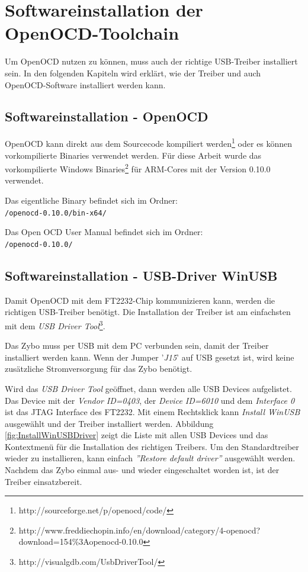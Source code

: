 \section{Softwareinstallation der OpenOCD-Toolchain}
\label{kapitel:SoftwareinstallationOpenOCDToolchain}
Um OpenOCD nutzen zu können, muss auch der richtige USB-Treiber installiert sein.
In den folgenden Kapiteln wird erklärt, wie der Treiber und auch OpenOCD-Software installiert werden kann.


\subsection{Softwareinstallation - OpenOCD}
OpenOCD kann direkt aus dem Sourcecode kompiliert werden\footnote{http://sourceforge.net/p/openocd/code/} oder es können vorkompilierte Binaries verwendet werden.
Für diese Arbeit wurde das vorkompilierte Windows Binaries\footnote{http://www.freddiechopin.info/en/download/category/4-openocd?download=154\%3Aopenocd-0.10.0} für ARM-Cores mit der Version 0.10.0 verwendet.

Das eigentliche Binary befindet sich im Ordner:\\
\texttt{/openocd-0.10.0/bin-x64/} 

Das Open OCD User Manual\cite{bib:OpenOCDDoku} befindet sich im Ordner:\\
\texttt{/openocd-0.10.0/} 


\subsection{Softwareinstallation - USB-Driver WinUSB}
\label{kapitel:usbTreiber}
Damit OpenOCD mit dem FT2232-Chip kommunizieren kann, werden die richtigen USB-Treiber benötigt.
Die Installation der Treiber ist am einfachsten mit dem \textit{USB Driver Tool}\footnote{http://visualgdb.com/UsbDriverTool/}.

Das Zybo muss per USB mit dem PC verbunden sein, damit der Treiber installiert werden kann.
Wenn der Jumper '\textit{J15}' auf USB gesetzt ist, wird keine zusätzliche Stromversorgung für das Zybo benötigt.

Wird das \textit{USB Driver Tool} geöffnet, dann werden alle USB Devices aufgelistet.
Das Device mit der \textit{Vendor ID=0403}, der \textit{Device ID=6010} und dem \textit{Interface 0} ist das JTAG Interface des FT2232.
Mit einem Rechtsklick kann \textit{Install WinUSB} ausgewählt und der Treiber installiert werden.
Abbildung \ref{fig:InstallWinUSBDriver} zeigt die Liste mit allen USB Devices und das Kontextmenü für die Installation des richtigen Treibers.
Um den Standardtreiber wieder zu installieren, kann einfach \textit{''Restore default driver''} ausgewählt werden.
Nachdem das Zybo einmal aus- und wieder eingeschaltet worden ist, ist der Treiber einsatzbereit.

